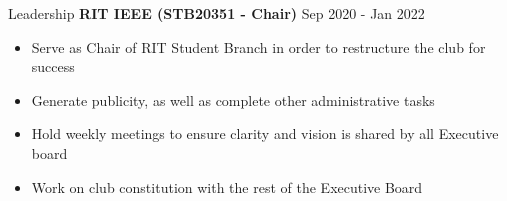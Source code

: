 \documentclass{resume} %
\begin{document}

\begin{rSection}{Leadership} 
\textbf{RIT IEEE (STB20351 - Chair)} \hfill Sep 2020 - Jan 2022
 \begin{itemize}
    \itemsep-3pt {} 
     \item Serve as Chair of RIT Student Branch in order to restructure the club for success
     \item Generate publicity, as well as complete other administrative tasks
     \item Hold weekly meetings to ensure clarity and vision is shared by all Executive board
     \item Work on club constitution with the rest of the Executive Board

 \end{itemize}


\end{rSection}
\end{document}
